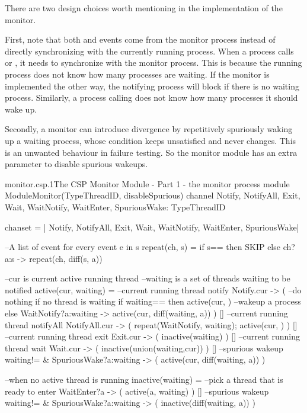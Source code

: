\documentclass[a4paper, 12pt]{article}
\begin{document}
There are two design choices worth mentioning in the implementation of the monitor. 

First, note that both  and  events come from the monitor process instead of directly synchronizing with the currently running process. When a process calls  or , it needs to synchronize with the monitor process. This is because the running process does not know how many processes are waiting. If the monitor is implemented the other way, the notifying process will block if there is no waiting process. Similarly, a process calling  does not know how many processes it should wake up. 

Secondly, a monitor can introduce divergence by repetitively spuriously waking up a waiting process, whose condition keeps unsatisfied and never changes. This is an unwanted behaviour in failure testing. So the monitor module has an extra parameter  to disable spurious wakeups. 


\begin{cspfloat}{monitor.csp.1}{The CSP Monitor Module - Part 1 - the monitor process}
module ModuleMonitor(TypeThreadID, disableSpurious)
  channel Notify, NotifyAll, Exit, Wait, 
          WaitNotify, WaitEnter, SpuriousWake: TypeThreadID

  chanset = {| Notify, NotifyAll, Exit, Wait, WaitNotify, WaitEnter, SpuriousWake|}

  --A list of event for every event e in s
  repeat(ch, s) = if s=={} then SKIP else ch?a:s -> repeat(ch, diff(s, {a}))

  --cur is current active running thread
  --waiting is a set of threads waiting to be notified
  active(cur, waiting) =
    --current running thread notify
    Notify.cur -> (
      --do nothing if no thread is waiting
      if waiting=={} then active(cur, {})
      --wakeup a process
      else WaitNotify?a:waiting -> 
           active(cur, diff(waiting, {a}))
    ) [] --current running thread notifyAll
    NotifyAll.cur -> (
      repeat(WaitNotify, waiting);
      active(cur, {})
    ) [] --current running thread exit
    Exit.cur -> (
      inactive(waiting)
    ) [] --current running thread wait
    Wait.cur -> (
      inactive(union(waiting,{cur}))
    ) [] --spurious wakeup
    waiting!={} & SpuriousWake?a:waiting -> (
      active(cur, diff(waiting, {a}))
    )

  --when no active thread is running
  inactive(waiting) = 
    --pick a thread that is ready to enter
    WaitEnter?a -> (
      active(a, waiting)
    ) []
    --spurious wakeup
    waiting!={} & SpuriousWake?a:waiting -> (
      inactive(diff(waiting, {a}))
    )
\end{cspfloat}
\end{document}
